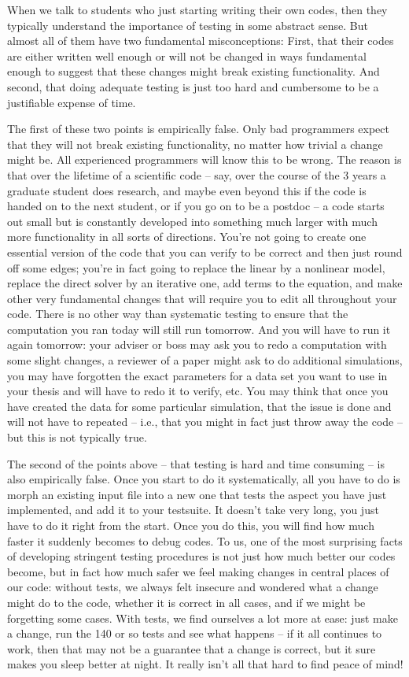 \documentclass{article}
\begin{document}
When we talk to students who just starting writing their own codes, then
they typically understand the importance of testing in some abstract
sense. But almost all of them have two fundamental misconceptions: First, that
their codes are either written well enough or will not be changed in ways
fundamental enough to suggest that these changes might break existing
functionality. And second, that doing adequate testing is just too hard and
cumbersome to be a justifiable expense of time.

The first of these two points is empirically false. Only bad programmers
expect that they will not break existing functionality, no matter how trivial
a change might be. All experienced programmers will know this to be wrong. The
reason is that over the lifetime of a scientific code -- say, over the course of
the 3 years a graduate student does research, and maybe even beyond this if
the code is handed on to the next student, or if you go on to be a postdoc --
a code starts out small but is constantly developed into something much larger
with much more functionality in all sorts of directions. You're not going to
create one essential version of the code that you can verify to be correct and
then just round off some edges; you're in fact going to replace the linear by
a nonlinear model, replace the direct solver by an iterative one, add terms to
the equation, and make other very fundamental changes that will require you to
edit all throughout your code. There is no other way than systematic testing
to ensure that the computation you ran today will still run tomorrow. And you
will have to run it again tomorrow: your adviser or boss may ask you to redo a
computation with some slight changes, a reviewer of a paper might ask to do
additional simulations, you may have forgotten the exact parameters for a data
set you want to use in your thesis and will have to redo it to verify,
etc. You may think that once you have created the data 
for some particular simulation, that the issue is done and will not have to
repeated -- i.e., that you might in fact just throw away the code -- but this
is not typically true.

The second of the points above -- that testing is hard and time consuming --
is also empirically false. Once you start to do it systematically, all you
have to do is morph an existing input file into a new one that tests the
aspect you have just implemented, and add it to your testsuite. It doesn't
take very long, you just have to do it right from the start. Once you do this,
you will find how much faster it suddenly becomes to debug codes. To us, one
of the most surprising facts of developing stringent testing procedures is not
just how much better our codes become, but in fact how much safer we feel
making changes in central places of our code: without tests, we always felt
insecure and wondered what a change might do to the code, whether it is
correct in all cases, and if we might be forgetting some cases. With tests,
we find ourselves a lot more at ease: just make a change, run the 140 or so
tests and see what happens -- if it all continues to work, then that may not
be a guarantee that a change is correct, but it sure makes you sleep better at
night. It really isn't all that hard to find peace of mind!
\end{document}
